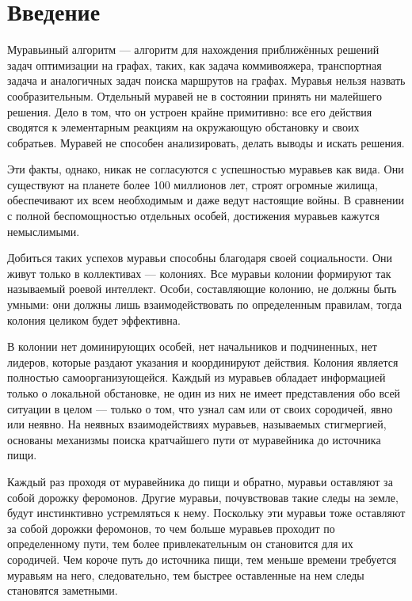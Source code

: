 \chapter*{Введение}

Муравьиный алгоритм --- алгоритм для нахождения приближённых решений задач оптимизации на графах, таких, как задача коммивояжера, транспортная задача и аналогичных задач поиска маршрутов на графах.
Муравья нельзя назвать сообразительным.
Отдельный муравей не в состоянии принять ни малейшего решения.
Дело в том, что он устроен крайне примитивно: все его действия сводятся к элементарным реакциям на окружающую обстановку и своих собратьев.
Муравей не способен анализировать, делать выводы и искать решения.

Эти факты, однако, никак не согласуются с успешностью муравьев как вида.
Они существуют на планете более 100 миллионов лет, строят огромные жилища, обеспечивают их всем необходимым и даже ведут настоящие войны.
В сравнении с полной беспомощностью отдельных особей, достижения муравьев кажутся немыслимыми.

Добиться таких успехов муравьи способны благодаря своей социальности.
Они живут только в коллективах --- колониях. Все муравьи колонии формируют так называемый роевой интеллект.
Особи, составляющие колонию, не должны быть умными: они должны лишь взаимодействовать по определенным  правилам, тогда колония целиком будет эффективна.

В колонии нет доминирующих особей, нет начальников и подчиненных, нет лидеров, которые раздают указания и координируют действия.
Колония является полностью самоорганизующейся.
Каждый из муравьев обладает информацией только о локальной обстановке, не один из них не имеет представления обо всей ситуации в целом --- только о том, что узнал сам или от своих сородичей, явно или неявно.
На неявных взаимодействиях муравьев, называемых стигмергией, основаны механизмы поиска кратчайшего пути от муравейника до источника пищи.

Каждый раз проходя от муравейника до пищи и обратно, муравьи оставляют за собой дорожку феромонов.
Другие муравьи, почувствовав такие следы на земле, будут инстинктивно устремляться к нему.
Поскольку эти муравьи тоже оставляют за собой дорожки феромонов, то чем больше муравьев проходит по определенному пути, тем более привлекательным он становится для их сородичей.
Чем короче путь до источника пищи, тем меньше времени требуется муравьям на него, следовательно, тем быстрее оставленные на нем следы становятся заметными.

